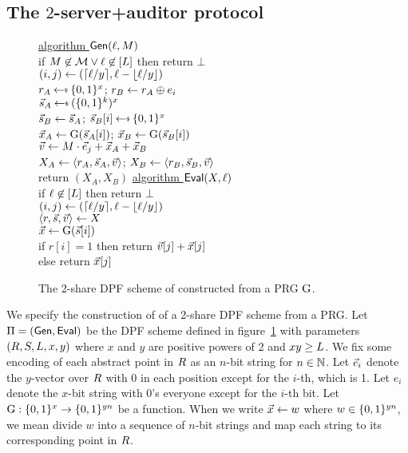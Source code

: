 %
\label{sec-riposte}

\subsection{The $2$-server+auditor protocol}
\begin{figure}
{
  \underline{algorithm $\mathsf{Gen}(\ell, M)$}\\[2pt]
  if $M \not\in \mathcal{M} \vee \ell \not\in [L]$ then return $\bot$\\
  $(i, j) \gets (\lceil \ell/y \rceil, \ell - \lfloor \ell/y \rfloor)$\\
  $r_A \getsr \bits^x$; $r_B \gets r_A \mathbin{\oplus} e_i$\\
  $\vecs_A \getsr (\bits^k)^x$ \\
  $\vec{s}_B \gets \vec{s}_A$; $\vecs_B[i] \getsr \bits^x$ \\
  $\vec{x}_A \gets \mathrm{G}(\vec{s}_A[i])$; $\vec{x}_B \gets \mathrm{G}(\vec{s}_B[i])$ \\
  $\vec{v} \gets M\cdot \vec{e}_j + \vec{x}_A + \vec{x}_B$ \\
  $X_A \gets \langle r_A, \vec{s}_A, \vec{v} \rangle$; $X_B \gets \langle r_B, \vec{s}_B, \vec{v} \rangle$\\
  return $(X_A, X_B)$
}
{
  \underline{algorithm $\mathsf{Eval}(X, \ell)$}\\[2pt]
  if $\ell \not\in [L]$ then return $\bot$\\
  $(i, j) \gets (\lceil \ell/y \rceil, \ell - \lfloor \ell/y \rfloor)$\\
  $\langle r, \vec{s}, \vec{v} \rangle \gets X$\\
  $\vec{x} \gets \mathrm{G}(\vec{s}[i])$\\
  if $r[i] = 1$ then return $\vec{v}[j] + \vec{x}[j]$\\
  else return $\vec{x}[j]$
}
\caption{The 2-share DPF scheme of \cite{riposte} constructed from a PRG
  $\mathrm{G}$.}
\label{fig-riposte-2share}
\end{figure}
We specify the construction of \cite{riposte} of a 2-share DPF scheme from a
PRG. Let $\mathrm{\Pi} = (\mathsf{Gen}, \mathsf{Eval})$ be the DPF scheme defined in
figure~\ref{fig-riposte-2share} with parameters $(R, S, L, x,
y)$ where $x$ and $y$ are positive powers of 2 and $xy \ge L$.
We fix some encoding of each abstract point in $R$ as an $n$-bit string for
$n \in \mathbb{N}$.
Let $\vec{e}_i$ denote the
$y$-vector over $R$ with $0$ in each position except for the $i$-th, which is 1.
Let $e_i$ denote the $x$-bit string with 0's everyone except for the $i$-th bit.
Let $\mathrm{G} : \{0,1\}^x \to \{0,1\}^{yn}$ be a function.
When we write $\vec{x} \gets w$ where $w \in \{0,1\}^{yn}$, we mean divide $w$ into
a sequence of $n$-bit strings and map each string to its corresponding point in
$R$.

